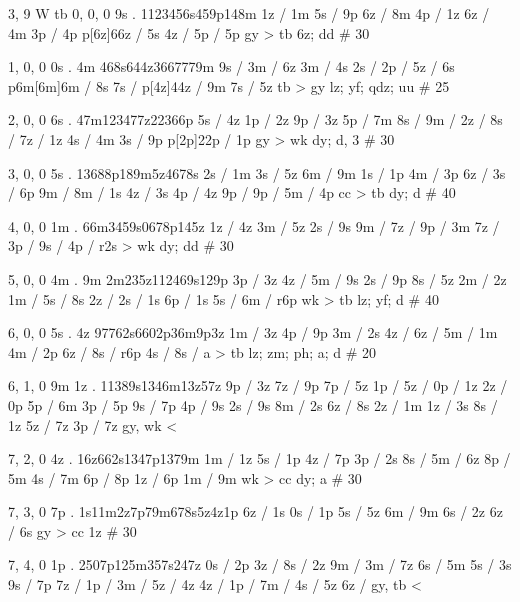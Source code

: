 3, 9
W
tb
0, 0, 0
9s . 
1123456s459p148m
1z / 1m 
5s / 9p 
6z / 8m 
4p / 1z 
6z / 4m 
3p / 4p 
p[6z]66z / 5s 
4z / 
5p / 5p
gy > tb 
6z; dd # 30 

1, 0, 0
0s . 4m 
468s644z3667779m 
9s / 
3m / 6z 
3m / 4s 
2s / 
2p / 
5z / 6s 
p6m[6m]6m / 8s 
7s / 
p[4z]44z / 9m 
7s / 5z 
tb > gy 
lz; yf; qdz; uu # 25

2, 0, 0 
6s .
47m123477z22366p 
5s / 4z 
1p / 2z 
9p / 3z 
5p / 7m 
8s / 
9m / 
2z / 
8s / 
7z / 1z 
4s / 4m 
3s / 9p 
p[2p]22p / 1p 
gy > wk
dy; d, 3 # 30

3, 0, 0
5s .
13688p189m5z4678s 
2s / 1m 
3s / 5z 
6m / 9m 
1s / 1p 
4m / 3p 
6z / 
3s / 6p 
9m / 
8m / 1s 
4z / 3s 
4p / 4z 
9p / 
9p / 
5m / 4p 
cc > tb 
dy; d # 40 

4, 0, 0 
1m . 
66m3459s0678p145z 
1z / 4z 
3m / 5z 
2s / 9s 
9m / 
7z / 
9p / 3m 
7z / 
3p / 
9s / 
4p / r2s 
> wk 
dy; dd # 30 

5, 0, 0 
4m . 9m 
2m235z112469s129p 
3p / 3z 
4z / 
5m / 9s 
2s / 9p 
8s / 5z 
2m / 2z 
1m / 
5s / 8s 
2z / 
2s / 1s 
6p / 1s 
5s / 
6m / r6p 
wk > tb 
lz; yf; d # 40 

6, 0, 0
5s . 4z 
97762s6602p36m9p3z 
1m / 3z 
4p / 9p 
3m / 2s 
4z / 
6z / 
5m / 1m 
4m / 2p 
6z / 
8s / r6p 
4s / 
8s / a
> tb 
lz; zm; ph; a; d # 20 

6, 1, 0 
9m 1z . 
11389s1346m13z57z 
9p / 3z 
7z / 9p 
7p / 5z 
1p / 
5z / 
0p / 1z 
2z / 0p 
5p / 6m 
3p / 5p 
9s / 7p 
4p / 9s 
2s / 9s 
8m / 2s 
6z / 8s 
2z / 1m 
1z / 3s 
8s / 1z 
5z / 7z 
3p / 7z 
gy, wk < 

7, 2, 0
4z . 
16z662s1347p1379m 
1m / 1z 
5s / 1p 
4z / 7p 
3p / 2s 
8s / 
5m / 6z 
8p / 5m 
4s / 7m 
6p / 8p 
1z / 6p 
1m / 9m 
wk > cc 
dy; a # 30 

7, 3, 0 
7p . 
1s11m2z7p79m678s5z4z1p 
6z / 1s 
0s / 1p 
5s / 5z 
6m / 9m 
6s / 2z 
6z / 6s 
gy > cc 
1z # 30 

7, 4, 0 
1p . 
2507p125m357s247z 
0s / 2p 
3z / 
8s / 2z 
9m / 
3m / 7z 
6s / 5m 
5s / 3s 
9s / 7p 
7z / 
1p / 
3m / 
5z / 4z 
4z / 
1p / 
7m / 
4s / 5z 
6z / 
gy, tb <
